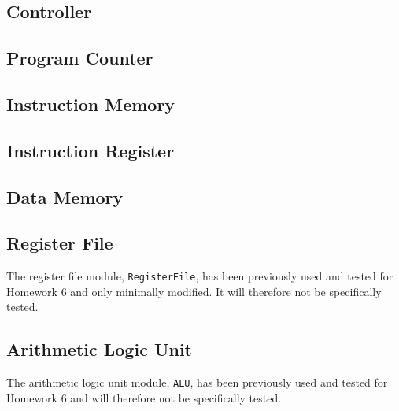 \subsection{Controller} %
\label{sub:controller}


\subsection{Program Counter} %
\label{sub:program_counter}


\subsection{Instruction Memory} %
\label{sub:instruction_memory}



\subsection{Instruction Register} %
\label{sub:instruction_register}


\subsection{Data Memory} %
\label{sub:data_memory}


\subsection{Register File} %
\label{sub:register_file}

The register file module, \verb|RegisterFile|, has been previously used and tested for Homework 6 and only minimally modified.
It will therefore not be specifically tested.

\subsection{Arithmetic Logic Unit} %
\label{sub:arithmetic_logic_unit}

The arithmetic logic unit module, \verb|ALU|, has been previously used and tested for Homework 6 and will therefore not be specifically tested.

